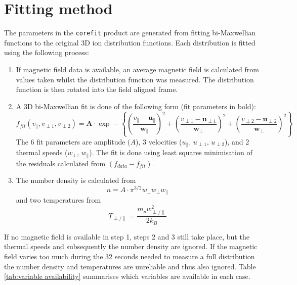 \documentclass[11pt,a4paper]{article}
\begin{document}
\section{Fitting method}
The parameters in the \texttt{corefit} product are generated from fitting bi-Maxwellian functions to the original 3D ion distribution functions. Each distribution is fitted using the following process:
\begin{enumerate}
	\item If magnetic field data is available, an average magnetic field is calculated from values taken whilst the distribution function was measured. The distribution function is then rotated into the field aligned frame.
	\item A 3D bi-Maxwellian fit is done of the following form (fit parameters in bold):
	\begin{equation}
		f_{fit} \left ( v_{\parallel}, v_{\perp 1}, v_{\perp 2} \right ) = \mathbf{A} \cdot \exp - \left \{ \left ( \frac{v_{\parallel} - \mathbf{u}_{\parallel}}{\mathbf{w}_{\parallel}} \right )^{2} + \left ( \frac{v_{\perp 1} - \mathbf{u}_{\perp 1}}{\mathbf{w}_{\perp}} \right )^{2} + \left ( \frac{v_{\perp 2} - \mathbf{u}_{\perp 2}}{\mathbf{w}_{\perp}} \right )^{2} \right \}
	\end{equation}
	The 6 fit parameters are amplitude ($A$), 3 velocities ($u_{\parallel}$, $u_{\perp 1}$, $u_{\perp 2}$), and 2 thermal speeds ($w_{\perp}$, $w_{\parallel}$). The fit is done using least squares minimisation of the residuals calculated from $\left (f_{data} - f_{fit}\right )$.
	\item The number density is calculated from
	\begin{equation}
		n = A \cdot \pi^{3/2}w_{\perp}w_{\perp}w_{\parallel}
	\end{equation}
	and two temperatures from
	\begin{equation}
		T_{\perp / \parallel} = \frac{m_{p}w_{\perp / \parallel}^{2}}{2k_{B}}
	\end{equation}
\end{enumerate}
If no magnetic field is available in step 1, steps 2 and 3 still take place, but the thermal speeds and subsequently the number density are ignored. If the magnetic field varies too much during the 32 seconds needed to measure a full distribution the number density and temperatures are unreliable and thus also ignored. Table \ref{tab:variable availability} summarises which variables are available in each case.
\end{document}
